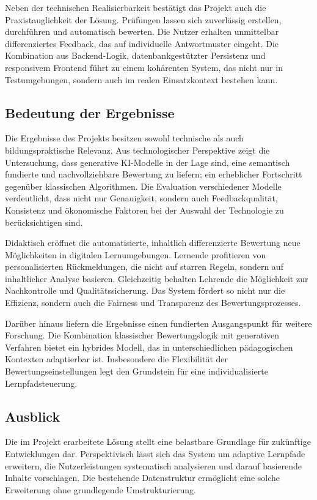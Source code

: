 \documentclass[a4paper,12pt]{article}
\begin{document}
Neben der technischen Realisierbarkeit bestätigt das Projekt auch die Praxistauglichkeit der Lösung. Prüfungen lassen sich zuverlässig erstellen, durchführen und automatisch bewerten. Die Nutzer erhalten unmittelbar differenziertes Feedback, das auf individuelle Antwortmuster eingeht. Die Kombination aus Backend-Logik, datenbankgestützter Persistenz und responsivem Frontend führt zu einem kohärenten System, das nicht nur in Testumgebungen, sondern auch im realen Einsatzkontext bestehen kann.

\subsection{Bedeutung der Ergebnisse}
Die Ergebnisse des Projekts besitzen sowohl technische als auch bildungspraktische Relevanz. Aus technologischer Perspektive zeigt die Untersuchung, dass generative KI-Modelle in der Lage sind, eine semantisch fundierte und nachvollziehbare Bewertung zu liefern; ein erheblicher Fortschritt gegenüber klassischen Algorithmen. Die Evaluation verschiedener Modelle verdeutlicht, dass nicht nur Genauigkeit, sondern auch Feedbackqualität, Konsistenz und ökonomische Faktoren bei der Auswahl der Technologie zu berücksichtigen sind.

Didaktisch eröffnet die automatisierte, inhaltlich differenzierte Bewertung neue Möglichkeiten in digitalen Lernumgebungen. Lernende profitieren von personalisierten Rückmeldungen, die nicht auf starren Regeln, sondern auf inhaltlicher Analyse basieren. Gleichzeitig behalten Lehrende die Möglichkeit zur Nachkontrolle und Qualitätssicherung. Das System fördert so nicht nur die Effizienz, sondern auch die Fairness und Transparenz des Bewertungsprozesses.

Darüber hinaus liefern die Ergebnisse einen fundierten Ausgangspunkt für weitere Forschung. Die Kombination klassischer Bewertungslogik mit generativen Verfahren bietet ein hybrides Modell, das in unterschiedlichen pädagogischen Kontexten adaptierbar ist. Insbesondere die Flexibilität der Bewertungseinstellungen legt den Grundstein für eine individualisierte Lernpfadsteuerung.

\subsection{Ausblick}
Die im Projekt erarbeitete Lösung stellt eine belastbare Grundlage für zukünftige Entwicklungen dar. Perspektivisch lässt sich das System um adaptive Lernpfade erweitern, die Nutzerleistungen systematisch analysieren und darauf basierende Inhalte vorschlagen. Die bestehende Datenstruktur ermöglicht eine solche Erweiterung ohne grundlegende Umstrukturierung.
\end{document}
